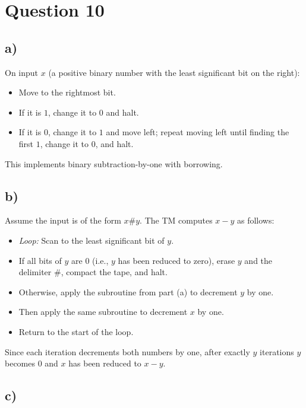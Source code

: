 \documentclass[a4paper, UTF-8]{article}
\theoremstyle{plain}
\begin{document}
\section{Question 10} 

\subsection{a)}

On input $x$ (a positive binary number with the least significant bit on the right):
\begin{itemize}
    \item Move to the rightmost bit.
    \item If it is $1$, change it to $0$ and halt.
    \item If it is $0$, change it to $1$ and move left; repeat moving left until finding the first $1$, change it to $0$, and halt.
\end{itemize}
This implements binary subtraction-by-one with borrowing.

\subsection{b)}

Assume the input is of the form $x \# y$. The TM computes $x - y$ as follows:
\begin{itemize}
    \item \emph{Loop:} Scan to the least significant bit of $y$.
    \item If all bits of $y$ are $0$ (i.e., $y$ has been reduced to zero), erase $y$ and the delimiter $\#$, compact the tape, and halt.
    \item Otherwise, apply the subroutine from part (a) to decrement $y$ by one.
    \item Then apply the same subroutine to decrement $x$ by one.
    \item Return to the start of the loop.
\end{itemize}
Since each iteration decrements both numbers by one, after exactly $y$ iterations $y$ becomes $0$ and $x$ has been reduced to $x - y$.

\subsection{c)}
\end{document}
